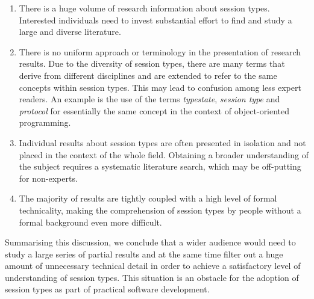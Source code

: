 %
\begin{enumerate}
	\item	There is a huge volume of research information about session types.
			Interested individuals need to invest substantial effort to find
			and study a large and diverse literature.

	\item	There is no uniform approach or terminology
			in the presentation of research results.
			Due to the diversity of session types,
			there are many terms that derive from different
			disciplines and are extended to refer to
			the same concepts within session types.
			This may lead to confusion among less
			expert readers.
			An example is the use of the terms \emph{typestate},
			\emph{session type} and \emph{protocol} for essentially the same concept
			in the context of object-oriented programming.

	\item	Individual results about session types are often presented in
			isolation and not placed in the context of the whole field.
			Obtaining a broader understanding of the subject requires a systematic
			literature search, which may be off-putting for non-experts.


	\item	The majority of results are tightly coupled
			with a high level of formal technicality, making the
			comprehension of session types by people without
			a formal background even more difficult.
\end{enumerate}
%
Summarising this discussion, we conclude that a wider
audience would need to study a large series of partial
results and at the same time filter out a huge amount
of unnecessary technical detail in order to achieve a satisfactory
level of understanding of session types. This situation is an obstacle for
the adoption of session types as part of practical software development.

